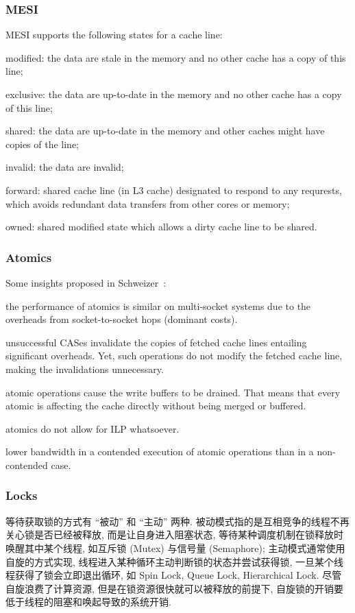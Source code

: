 \documentclass[UTF8,12pt,a4paper]{article}
\begin{document}
\subsubsection{MESI}
MESI supports the following states for a cache line:
\begin{compactitem}
  \item modified: the data are stale in the memory
  and no other cache has a copy of this line;
  \item exclusive: the data are up-to-date in the memory
  and no other cache has a copy of this line;
  \item shared: the data are up-to-date in the memory
  and other caches might have copies of the line;
  \item invalid: the data are invalid;
  \item forward: shared cache line (in L3 cache) designated to respond to any requrests,
  which avoids redundant data transfers from other cores or memory;
  \item owned: shared modified state which allows a dirty cache line to be shared.
\end{compactitem}
\subsubsection{Atomics}
Some insights proposed in Schweizer~\cite{DBLP:conf/IEEEpact/SchweizerBH15}:
\begin{compactitem}
  \item the performance of atomics is similar on multi-socket systems
  due to the overheads from socket-to-socket hops (dominant costs).
  \item unsuccessful CASes invalidate the copies of fetched cache lines
  entailing significant overheads.
  Yet, such operations do not modify the fetched cache line,
  making the invalidations unnecessary.
  \item atomic operations cause the write buffers to be drained.
  That means that every atomic is affecting the cache directly
  without being merged or buffered.
  \item atomics do not allow for ILP whatsoever.
  \item lower bandwidth in a contended execution of atomic operations
  than in a non-contended case.
\end{compactitem}
\subsubsection{Locks}
等待获取锁的方式有 ``被动'' 和 ``主动'' 两种.
被动模式指的是互相竞争的线程不再关心锁是否已经被释放,
而是让自身进入阻塞状态,
等待某种调度机制在锁释放时唤醒其中某个线程,
如互斥锁 (Mutex) 与信号量 (Semaphore);
主动模式通常使用自旋的方式实现,
线程进入某种循环主动判断锁的状态并尝试获得锁,
一旦某个线程获得了锁会立即退出循环,
如 Spin Lock, Queue Lock, Hierarchical Lock.
尽管自旋浪费了计算资源, 但是在锁资源很快就可以被释放的前提下,
自旋锁的开销要低于线程的阻塞和唤起导致的系统开销.
\end{document}
